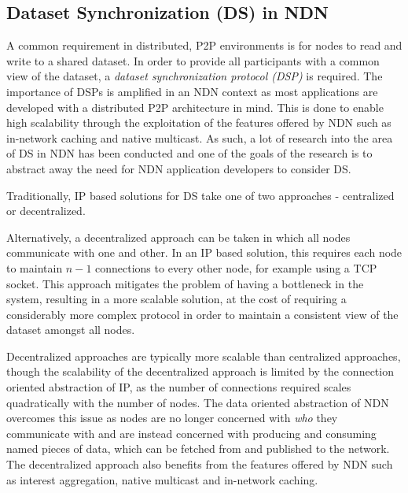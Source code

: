 \subsection{Dataset Synchronization (DS) in NDN}\label{sec:dataset-sync}
A common requirement in distributed, P2P environments is for nodes to read and write to a shared dataset. In order to provide all participants with a common view of the dataset, a \textit{dataset synchronization protocol (DSP)} is required. The importance of DSPs is amplified in an NDN context as most applications are developed with a distributed P2P architecture in mind. This is done to enable high scalability through the exploitation of the features offered by NDN such as in-network caching and native multicast. As such, a lot of research into the area of DS in NDN has been conducted and one of the goals of the research is to abstract away the need for NDN application developers to consider DS.

Traditionally, IP based solutions for DS take one of two approaches - centralized or decentralized. 


Alternatively, a decentralized approach can be taken in which all nodes communicate with one and other. In an IP based solution, this requires each node to maintain $n-1$ connections to every other node, for example using a TCP socket. This approach mitigates the problem of having a bottleneck in the system, resulting in a more scalable solution, at the cost of requiring a considerably more complex protocol in order to maintain a consistent view of the dataset amongst all nodes.

Decentralized approaches are typically more scalable than centralized approaches, though the scalability of the decentralized approach is limited by the connection oriented abstraction of IP, as the number of connections required scales quadratically with the number of nodes. The data oriented abstraction of NDN overcomes this issue as nodes are no longer concerned with \textit{who} they communicate with and are instead concerned with producing and consuming named pieces of data, which can be fetched from and published to the network. The decentralized approach also benefits from the features offered by NDN such as interest aggregation, native multicast and in-network caching.

